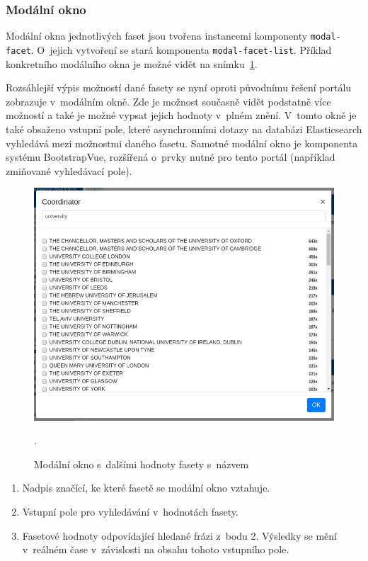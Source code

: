 \subsubsection*{Modální okno}
Modální okna jednotlivých faset jsou tvořena instancemi komponenty \texttt{modal-facet}. O~jejich vytvoření se stará komponenta \texttt{modal-facet-list}. Příklad konkretního modálního okna je možné vidět na snímku~\ref{img:modal}.

Rozsáhlejší výpis možností dané fasety se nyní oproti původnímu řešení portálu zobrazuje v~modálním okně. Zde je možnost současně vidět podstatně více možností a také je možné vypsat jejich hodnoty v~plném znění. V~tomto okně je také obsaženo vstupní pole, které asynchronními dotazy na databázi Elasticsearch vyhledává mezi možnostmi daného fasetu. Samotné modální okno je komponenta systému BootstrapVue, rozšířená o~prvky nutné pro tento portál (například zmiňované vyhledávací pole).

\begin{figure}[H]
	\centering
	\includegraphics[width=\textwidth]{obrazky-figures/my-modal.png}
	\caption{Modální okno s~dalšími hodnoty fasety s~názvem }.
	\label{img:modal}
\end{figure}
\begin{enumerate}
    \item Nadpis značící, ke které fasetě se modální okno vztahuje.
    \item Vstupní pole pro vyhledávání v~hodnotách fasety.
    \item Fasetové hodnoty odpovídající hledané frázi z~bodu 2. Výsledky se mění v~reálném čase v~závislosti na obsahu tohoto vstupního pole.
\end{enumerate}

